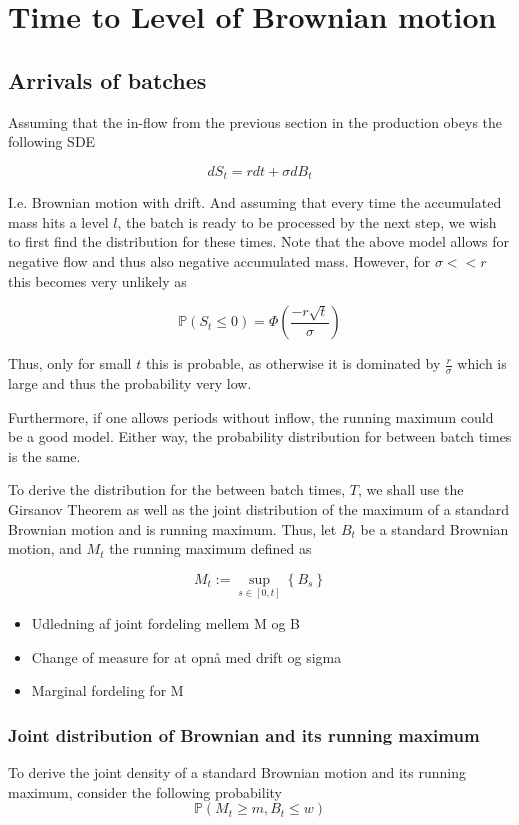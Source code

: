 \documentclass[../Thesis.tex]{subfiles}
\begin{document}
\chapter{Time to Level of Brownian motion}


\section{Arrivals of batches}
Assuming that the in-flow from the previous section in the production obeys the following SDE

$$dS_t = r dt + \sigma dB_t$$

I.e. Brownian motion with drift. And assuming that every time the accumulated mass hits a level $l$, the batch is ready to be processed by the next step, we wish to first find the distribution for these times. Note that the above model allows for negative flow and thus also negative accumulated mass. However, for $\sigma << r$ this becomes very unlikely as

$$\mathbb{P} \left( S_t \leq 0\right) = \Phi \left( \frac{-r \sqrt{t}}{\sigma } \right)$$

Thus, only for small $t$ this is probable, as otherwise it is dominated by $\frac{r}{\sigma}$ which is large and thus the probability very low.

Furthermore, if one allows periods without inflow, the running maximum could be a good model. Either way, the probability distribution for between batch times is the same.


To derive the distribution for the between batch times, $T$, we shall use the Girsanov Theorem as well as the joint distribution of the maximum of a standard Brownian motion and is running maximum. Thus, let $B_t$ be a standard Brownian motion, and $M_t$ the running maximum defined as

$$M_t := \sup_{s\in [0,t]} \left\{ B_s \right\}$$


\begin{itemize}
    \item Udledning af joint fordeling mellem M og B
    \item Change of measure for at opnå med drift og sigma
    \item Marginal fordeling for M
\end{itemize}





\subsection{Joint distribution of Brownian and its running maximum}
To derive the joint density of a standard Brownian motion and its running maximum, consider the following probability
$$\mathbb{P}\left(M_t \geq m, B_t \leq w\right)$$
\end{document}
